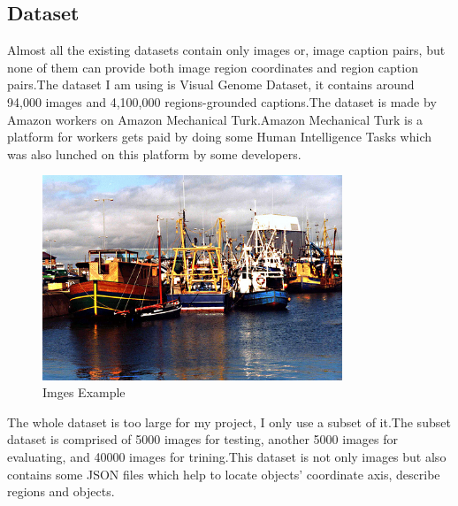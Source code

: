 \documentclass[12pt,a4paper]{report}
\begin{document}
\subsection{Dataset}
Almost all the existing datasets contain only images or, image caption pairs, but none of them can provide both image region coordinates and region caption pairs.The dataset I am using is Visual Genome Dataset\cite{images}, it contains around 94,000 images and 4,100,000 regions-grounded captions.The dataset is made by Amazon workers on Amazon Mechanical Turk.Amazon Mechanical Turk is a platform for workers gets paid by doing some Human Intelligence Tasks which was also lunched on this platform by some developers.
\begin{figure}[h]
\centering
\includegraphics[width=0.8\textwidth]{2356274.jpg}
\caption{Imges Example}
\end{figure}

The whole dataset is too large for my project, I only use a subset of it.The subset dataset is comprised of  5000 images for testing, another 5000 images for evaluating, and 40000 images for trining.This dataset is not only images but also contains some JSON files which help to locate objects' coordinate axis, describe regions and objects.
\end{document}
